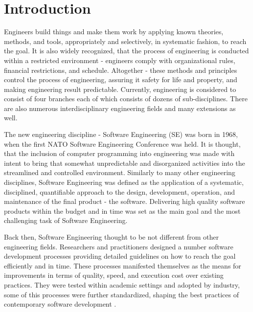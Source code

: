 \chapter{Introduction}
Engineers build things and make them work by applying known theories, methods, 
and tools, appropriately and selectively, in systematic fashion, to reach the goal. 
It is also widely recognized, that the process of engineering is conducted 
within a restricted environment - engineers comply with organizational rules, 
financial restrictions, and schedule. Altogether - these methods and principles 
control the process of engineering, assuring it safety for life and property, 
and making engineering result predictable. Currently, engineering is considered to 
consist of four branches each of which consists of dozens of sub-disciplines. 
There are also numerous interdisciplinary 
engineering fields and many extensions as well. 

The new engineering discipline - Software Engineering (SE) was born in 1968, 
when the first NATO Software Engineering Conference was held. It is thought, 
that the inclusion of computer programming into engineering was made 
with intent to bring that somewhat unpredictable and disorganized activities 
into the streamlined and controlled environment. 
Similarly to many other engineering disciplines, Software Engineering was 
defined as the application of a systematic, disciplined, quantifiable 
approach to the design, development, operation, and maintenance of the 
final product - the software.
Delivering high quality software products within the budget and in 
time was set as the main goal and the most challenging task 
of Software Engineering.

Back then, Software Engineering thought to be not different from other engineering fields.
Researchers and practitioners designed a number software development processes 
providing detailed guidelines on how to reach the goal efficiently and in time. 
These processes manifested themselves as the means for improvements in terms of quality, 
speed, and execution cost over existing practices. They were tested within academic 
settings and adopted by industry, some of this processes were 
further standardized, shaping the best practices of contemporary 
software development \cite{citeulike:9962021}. 

